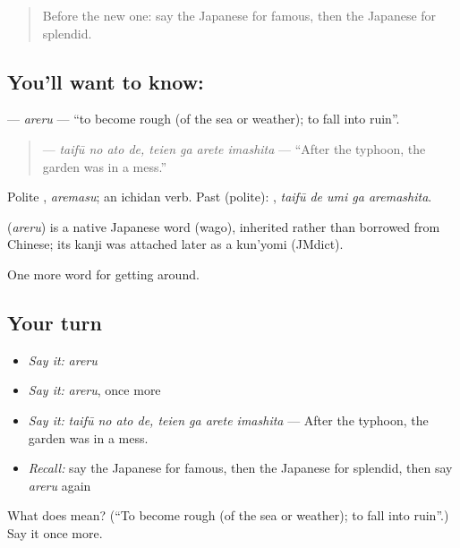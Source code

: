 \begin{quote}
Before the new one: say the Japanese for famous, then the Japanese for splendid.
\end{quote}

\subsection*{You'll want to know: }
\textbf{} — \emph{areru} — \textquotedblleft{}to become rough (of the sea or weather); to fall into ruin\textquotedblright{}.

\begin{quote}
\textbf{  } — \emph{taifū no ato de, teien ga arete imashita} — \textquotedblleft{}After the typhoon, the garden was in a mess.\textquotedblright{}
\end{quote}

Polite \textbf{}, \emph{aremasu}; an ichidan verb. Past (polite): \textbf{  }, \emph{taifū de umi ga aremashita}.

\begin{cousinweb}
\textbf{} (\emph{areru}) is a native Japanese word (wago), inherited rather than borrowed from Chinese; its kanji was attached later as a kun'yomi (JMdict).
\end{cousinweb}

\begin{grammarlens}[title={What you've built}]
One more word for getting around.
\end{grammarlens}

\subsection*{Your turn}
\begin{itemize}
\raggedright
  \item \emph{Say it:} \emph{areru}
  \item \emph{Say it:} \emph{areru}, once more
  \item \emph{Say it:} \emph{taifū no ato de, teien ga arete imashita} — After the typhoon, the garden was in a mess.
  \item \emph{Recall:} say the Japanese for famous, then the Japanese for splendid, then say \emph{areru} again
\end{itemize}

\begin{tcolorbox}[breakable,colback=teal!4,colframe=teal!35!black,title={Before you move on}]
What does  mean? (\textquotedblleft{}To become rough (of the sea or weather); to fall into ruin\textquotedblright{}.) Say it once more.
\end{tcolorbox}
